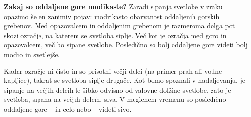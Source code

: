\begin{example}{\bf Zakaj so oddaljene gore modikaste?}
Zaradi sipanja svetlobe v zraku opazimo še en zanimiv pojav: modrikasto
obarvanost oddaljenih gorskih grebenov. Med opazovalcem in oddaljenim grebenom
je razmeroma dolga pot skozi ozračje, na katerem se svetloba siplje. Več kot
je ozračja med goro in opazovalcem, več bo sipane svetlobe. Posledično so
bolj oddaljene gore videti bolj modro in svetlejše. 

Kadar ozračje ni čisto in so prisotni večji delci (na primer prah ali vodne kapljice),
takrat se svetloba siplje drugače. Kot bomo spoznali v nadaljevanju, je sipanje
na večjih delcih le šibko odvisno od valovne dolžine svetlobe, zato je svetloba, sipana
na večjih delcih, siva. V meglenem vremenu so posledično oddaljene gore -- in celo nebo -- 
videti sivo.
\end{example}

